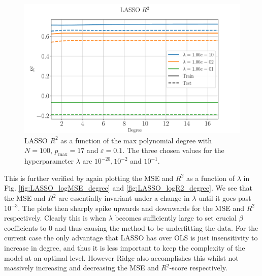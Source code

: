 \documentclass[%
reprint,
amsmath,amssymb,
aps,
pra,
]{revtex4-2}
\begin{document}
\begin{figure}[ht!]
	\centering
	\includegraphics[width=\linewidth]{Python/Figures/LASSO/LASSO_R2_no_scaling.pdf}
	\caption{LASSO $R^2$ as a function of the max polynomial degree with \(N=100\), \(p_{\text{max}}=17\) and \(\varepsilon=0.1\). The three chosen values for the hyperparameter $\lambda$ are $10^{-20},10^{-2}$ and $10^{-1}$.}
	\label{fig:lasso_r2_degree}
\end{figure}

This is further verified by again plotting the MSE and $R^2$ as a function of $\lambda$ in Fig. \ref{fig:LASSO_logMSE_degree} and \ref{fig:LASSO_logR2_degree}. We see that the MSE and $R^2$ are essentially invariant under a change in $\lambda$ until it goes past $10^{-3}$. The plots then sharply spike upwards and downwards for the MSE and $R^2$ respectively. Clearly this is when $\lambda$ becomes sufficiently large to set crucial $\beta$ coefficients to $0$ and thus causing the method to be underfitting the data. For the current case the only advantage that LASSO has over OLS is just insensitivity to increase in degree, and thus it is less important to keep the complexity of the model at an optimal level. However Ridge also accomplishes this whilst not massively increasing and decreasing the MSE and $R^2$-score respectively.
\end{document}
